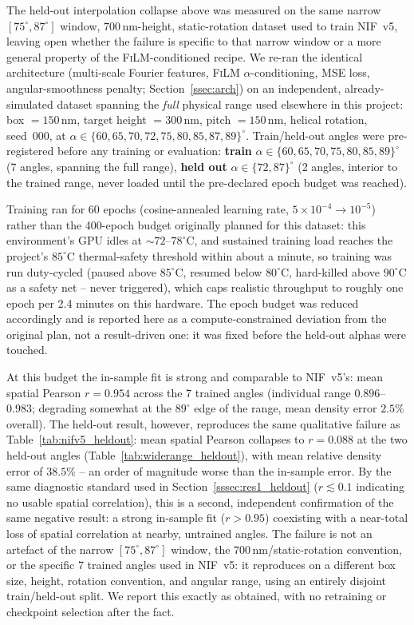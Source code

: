 \documentclass[aip,amsmath,amssymb,reprint]{revtex4-1}
\renewcommand{\ang}{\ensuremath{\alpha}} %
\newcommand{\nif}{\textsc{NIF}}
\newcommand{\film}{\textsc{FiLM}}
\begin{document}
The held-out interpolation collapse above was measured on the same
narrow $[75^{\circ},87^{\circ}]$ window, $700\,$nm-height,
static-rotation dataset used to train \nif{}~v5, leaving open whether
the failure is specific to that narrow window or a more general
property of the \film{}-conditioned recipe. We re-ran the identical
architecture (multi-scale Fourier features, \film{} $\alpha$-conditioning,
MSE loss, angular-smoothness penalty; Section~\ref{ssec:arch}) on an
independent, already-simulated dataset spanning the \emph{full}
physical range used elsewhere in this project: box $=150\,$nm,
target height $=300\,$nm, pitch $=150\,$nm, helical rotation, seed~000,
at $\ang \in \{60,65,70,72,75,80,85,87,89\}^{\circ}$. Train/held-out
angles were pre-registered before any training or evaluation:
\textbf{train} $\ang \in \{60,65,70,75,80,85,89\}^{\circ}$ (7 angles,
spanning the full range), \textbf{held out}
$\ang \in \{72,87\}^{\circ}$ (2 angles, interior to the trained range,
never loaded until the pre-declared epoch budget was reached).

Training ran for 60 epochs (cosine-annealed learning rate,
$5\times10^{-4}\to10^{-5}$) rather than the 400-epoch budget
originally planned for this dataset: this environment's GPU idles at
$\sim\!72$--$78^{\circ}$C, and sustained training load reaches the
project's $85^{\circ}$C thermal-safety threshold within about a
minute, so training was run duty-cycled (paused above $85^{\circ}$C,
resumed below $80^{\circ}$C, hard-killed above $90^{\circ}$C as a
safety net -- never triggered), which caps realistic throughput to
roughly one epoch per 2.4 minutes on this hardware. The epoch budget
was reduced accordingly and is reported here as a compute-constrained
deviation from the original plan, not a result-driven one: it was
fixed before the held-out alphas were touched.

At this budget the in-sample fit is strong and comparable to
\nif{}~v5's: mean spatial Pearson $r = 0.954$ across the 7 trained
angles (individual range $0.896$--$0.983$; degrading somewhat at the
$89^{\circ}$ edge of the range, mean density error $2.5\%$ overall).
The held-out result, however, reproduces the same qualitative failure
as Table~\ref{tab:nifv5_heldout}: mean spatial Pearson collapses to
$r = 0.088$ at the two held-out angles
(Table~\ref{tab:widerange_heldout}), with mean relative density error
of $38.5\%$ -- an order of magnitude worse than the in-sample error.
By the same diagnostic standard used in
Section~\ref{sssec:res1_heldout} ($r \lesssim 0.1$ indicating no
usable spatial correlation), this is a second, independent
confirmation of the same negative result: a strong in-sample fit
($r>0.95$) coexisting with a near-total loss of spatial correlation
at nearby, untrained angles. The failure is not an artefact of the
narrow $[75^{\circ},87^{\circ}]$ window, the $700\,$nm/static-rotation
convention, or the specific 7 trained angles used in \nif{}~v5: it
reproduces on a different box size, height, rotation convention, and
angular range, using an entirely disjoint train/held-out split. We
report this exactly as obtained, with no retraining or checkpoint
selection after the fact.
\end{document}
